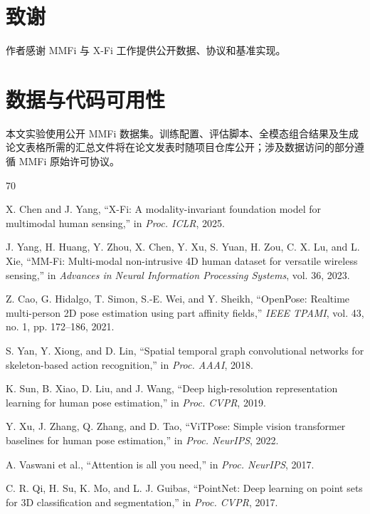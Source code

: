 \documentclass[journal]{IEEEtran}
\begin{document}
\section*{致谢}
作者感谢 MMFi 与 X-Fi 工作提供公开数据、协议和基准实现。

\section*{数据与代码可用性}
本文实验使用公开 MMFi 数据集。训练配置、评估脚本、全模态组合结果及生成论文表格所需的汇总文件将在论文发表时随项目仓库公开；涉及数据访问的部分遵循 MMFi 原始许可协议。

\iffalse
\begin{thebibliography}{70}


X. Chen and J. Yang, ``X-Fi: A modality-invariant foundation model for multimodal human sensing,'' in \emph{Proc. ICLR}, 2025.

J. Yang, H. Huang, Y. Zhou, X. Chen, Y. Xu, S. Yuan, H. Zou, C. X. Lu, and L. Xie,
``MM-Fi: Multi-modal non-intrusive 4D human dataset for versatile wireless sensing,'' in \emph{Advances in Neural Information Processing Systems}, vol. 36, 2023.

Z. Cao, G. Hidalgo, T. Simon, S.-E. Wei, and Y. Sheikh, ``OpenPose: Realtime multi-person 2D pose estimation using part affinity fields,'' \emph{IEEE TPAMI}, vol. 43, no. 1, pp. 172--186, 2021.

S. Yan, Y. Xiong, and D. Lin, ``Spatial temporal graph convolutional networks for skeleton-based action recognition,'' in \emph{Proc. AAAI}, 2018.

K. Sun, B. Xiao, D. Liu, and J. Wang, ``Deep high-resolution representation learning for human pose estimation,'' in \emph{Proc. CVPR}, 2019.

Y. Xu, J. Zhang, Q. Zhang, and D. Tao, ``ViTPose: Simple vision transformer baselines for human pose estimation,'' in \emph{Proc. NeurIPS}, 2022.

A. Vaswani et al., ``Attention is all you need,'' in \emph{Proc. NeurIPS}, 2017.

C. R. Qi, H. Su, K. Mo, and L. J. Guibas, ``PointNet: Deep learning on point sets for 3D classification and segmentation,'' in \emph{Proc. CVPR}, 2017.


\end{thebibliography}
\end{document}
